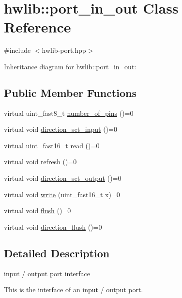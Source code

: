 \hypertarget{classhwlib_1_1port__in__out}{}\section{hwlib\+:\+:port\+\_\+in\+\_\+out Class Reference}
\label{classhwlib_1_1port__in__out}


{\ttfamily \#include $<$hwlib-\/port.\+hpp$>$}



Inheritance diagram for hwlib\+:\+:port\+\_\+in\+\_\+out\+:
\subsection*{Public Member Functions}
\begin{DoxyCompactItemize}
\item 
virtual uint\+\_\+fast8\+\_\+t \hyperlink{classhwlib_1_1port__in__out_a44243a6c7664e734563f1809058751bc}{number\+\_\+of\+\_\+pins} ()=0
\item 
virtual void \hyperlink{classhwlib_1_1port__in__out_ac7a9611410ddb9fd5d8e2dd15bff0a3f}{direction\+\_\+set\+\_\+input} ()=0
\item 
virtual uint\+\_\+fast16\+\_\+t \hyperlink{classhwlib_1_1port__in__out_a5f6662d6fccd2b256d20722a4f3e5840}{read} ()=0
\item 
virtual void \hyperlink{classhwlib_1_1port__in__out_afa3680e36a05dd3f5a0eac1b63aac37c}{refresh} ()=0
\item 
virtual void \hyperlink{classhwlib_1_1port__in__out_a515b4a6bbde4f2df5bb11cda41234fe4}{direction\+\_\+set\+\_\+output} ()=0
\item 
virtual void \hyperlink{classhwlib_1_1port__in__out_a0019c1f35d6f7b1d3ace6b22da86ecec}{write} (uint\+\_\+fast16\+\_\+t x)=0
\item 
virtual void \hyperlink{classhwlib_1_1port__in__out_a164564bcd08c137f0ff2e6445e9cfe5e}{flush} ()=0
\item 
virtual void \hyperlink{classhwlib_1_1port__in__out_a431b79eee48a21a93978bfdf6620f800}{direction\+\_\+flush} ()=0
\end{DoxyCompactItemize}


\subsection{Detailed Description}
input / output port interface

This is the interface of an input / output port. 

